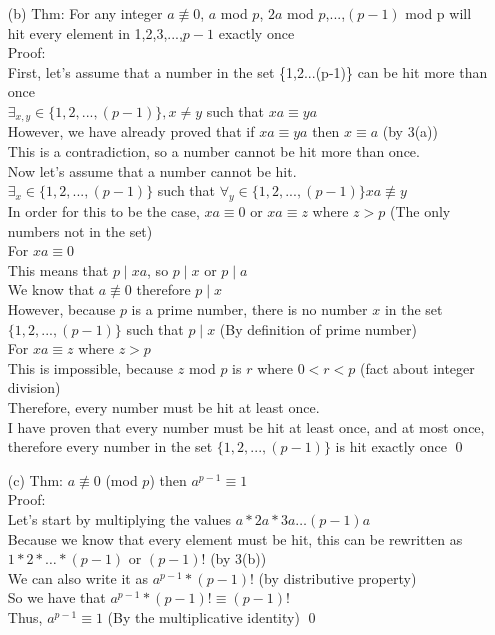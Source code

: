 \documentclass[11pt]{article}
\theoremstyle{definition}
\begin{document}
\begin{enumerate}
	\item[(b)]
	Thm: For any integer $a \not\equiv 0$, $a$ mod $p$, $2a$ mod $p$,...,$(p-1)$ mod p will hit every element in 1,2,3,...,$p-1$ exactly once\\
	Proof:\\
	First, let's assume that a number in the set \{1,2...(p-1)\} can be hit more than once\\
	$\exists_{x,y} \in \{1,2,...,(p-1)\}, x \neq y $ such that $xa \equiv ya$ \\
	However, we have already proved that if $xa \equiv ya$ then $x \equiv a$ (by 3(a))\\
	This is a contradiction, so a number cannot be hit more than once.\\
	\newline
	Now let's assume that a number cannot be hit.\\
	$\exists_x \in \{1,2,...,(p-1)\}$ such that $\forall_y \in \{1,2,...,(p-1)\} xa \not \equiv y$\\
	In order for this to be the case, $xa \equiv 0$ or $xa \equiv z$ where $z > p$ (The only numbers not in the set)\\
	\newline
	For $xa \equiv 0$\\
	This means that $p \mid xa$, so $p \mid x$ or $p \mid a$\\
	We know that $a \not \equiv 0$ therefore $p \mid x$\\
	However, because $p$ is a prime number, there is no number $x$ in the set $\{1,2,...,(p-1)\}$ such that $p \mid x$ (By definition of prime number)\\
	\newline
	For $xa \equiv z$ where $z > p$\\
	This is impossible, because $z$ mod $p$ is $r$ where $0 < r < p$ (fact about integer division)\\
	\newline
	Therefore, every number must be hit at least once.\\
	I have proven that every number must be hit at least once, and at most once, therefore every number in the set $\{1,2,...,(p-1)\}$ is hit exactly once \qed

	\item[(c)]
	Thm: $a \not\equiv 0$ (mod $p$) then $a^{p-1} \equiv 1$\\
	Proof:\\
	Let's start by multiplying the values $a*2a*3a\dots (p-1)a$\\
	Because we know that every element must be hit, this can be rewritten as $1*2*\dots*(p-1)$ or $(p-1)!$ (by 3(b))\\
	We can also write it as $a^{p-1} * (p-1)!$ (by distributive property)\\
	So we have that $a^{p-1} * (p-1)! \equiv (p-1)!$\\
	Thus, $a^{p-1} \equiv 1$ (By the multiplicative identity) \qed


\end{enumerate}
\end{document}
